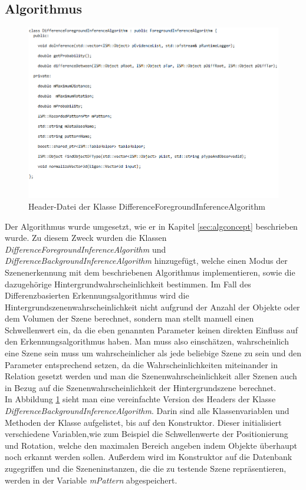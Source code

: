 \subsection{Algorithmus}\label{sub:alg}
\begin{figure}
	\centering
	\includegraphics[width=17cm]{bilder/DifferenceClass.pdf}
	\caption{Header-Datei der Klasse DifferenceForegroundInferenceAlgorithm}
	\label{img:diffclass}
\end{figure}
Der Algorithmus wurde umgesetzt, wie er in Kapitel \ref{sec:algconcept} beschrieben wurde. Zu diesem Zweck wurden die Klassen \textit{DifferenceForegroundInferenceAlgorithm} und \textit{DifferenceBackgroundInferenceAlgorithm} hinzugefügt, welche einen Modus der Szenenerkennung mit dem beschriebenen Algorithmus implementieren, sowie die dazugehörige Hintergrundwahrscheinlichkeit bestimmen. Im Fall des Differenzbasierten Erkennungsalgorithmus wird die Hintergrundszenenwahrscheinlichkeit nicht aufgrund der Anzahl der Objekte oder dem Volumen der Szene berechnet, sondern man stellt manuell einen Schwellenwert ein, da die eben genannten Parameter keinen direkten Einfluss auf den Erkennungsalgorithmus haben. Man muss also einschätzen, wahrscheinlich eine Szene sein muss um wahrscheinlicher als jede beliebige Szene zu sein und den Parameter entsprechend setzen, da die Wahrscheinlichkeiten miteinander in Relation gesetzt werden und man die Szenenwahrscheinlichkeit aller Szenen auch in Bezug auf die Szenenwahrscheinlichkeit der Hintergrundszene berechnet.\smallskip\\
In Abbildung \ref{img:diffclass} sieht man eine vereinfachte Version des Headers der Klasse \textit{DifferenceBackgroundInferenceAlgorithm}. Darin sind alle Klassenvariablen und Methoden der Klasse aufgelistet, bis auf den Konstruktor. Dieser initialisiert verschiedene Variablen,wie zum Beispiel die Schwellenwerte der Positionierung und Rotation, welche den maximalen Bereich angeben indem Objekte überhaupt noch erkannt werden sollen. Außerdem wird im Konstruktor auf die Datenbank zugegriffen und die Szeneninstanzen, die die zu testende Szene repräsentieren, werden in der Variable \textit{mPattern} abgespeichert.\smallskip\\
